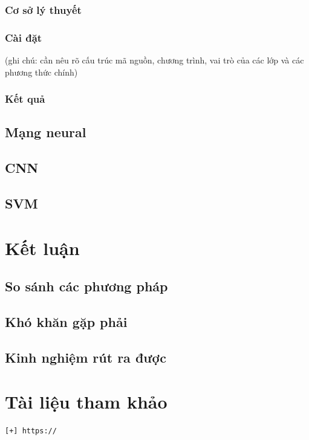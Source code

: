 \documentclass[a4paper,12pt]{report}
\begin{document}
\subsection{Cơ sở lý thuyết}
\subsection{Cài đặt}
(ghi chú: cần nêu rõ cấu trúc mã nguồn, chương trình, vai trò của các lớp và các phương thức chính)

\subsection{Kết quả}
\section{Mạng neural}
\section{CNN}
\section{SVM}
\chapter{Kết luận}
\section{So sánh các phương pháp}
\section{Khó khăn gặp phải}
\section{Kinh nghiệm rút ra được}
\chapter{Tài liệu tham khảo}
\begin{verbatim}
[+] https://

\end{verbatim}
\end{document}
